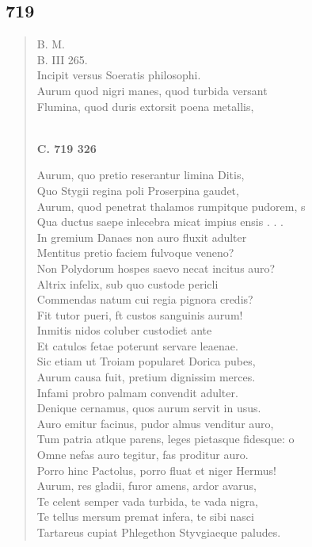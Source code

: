 \documentclass[11pt, a4paper]{report}
\begin{document}
            \subsection*{719}
      \begin{verse}
      B. M. \\ B. III 265. \\ Incipit versus Soeratis philosophi. \\ Aurum quod nigri manes, quod turbida versant \\ Flumina, quod duris extorsit poena metallis, \\ 
        ﻿\pagebreak 
    \begin{center} \textbf{C. 719 326} \end{center} \marginpar{[194]} Aurum, quo pretio reserantur limina Ditis, \\ Quo Stygii regina poli Proserpina gaudet, \\ Aurum, quod penetrat thalamos rumpitque pudorem, s \\ Qua ductus saepe inlecebra micat impius ensis . . . \\ In gremium Danaes non auro fluxit adulter \\ Mentitus pretio faciem fulvoque veneno? \\ Non Polydorum hospes saevo necat incitus auro? \\ Altrix infelix, sub quo custode pericli \\ Commendas natum cui regia pignora credis? \\ Fit tutor pueri, ft custos sanguinis aurum! \\ Inmitis nidos coluber custodiet ante \\ Et catulos fetae poterunt servare leaenae. \\ Sic etiam ut Troiam popularet Dorica pubes, \\ Aurum causa fuit, pretium dignissim merces. \\ Infami probro palmam convendit adulter. \\ Denique cernamus, quos aurum servit in usus. \\ Auro emitur facinus, pudor almus venditur auro, \\ Tum patria  \lbrack atlque parens, leges pietasque fidesque: o \\ Omne nefas auro tegitur, fas proditur auro. \\ Porro hinc Pactolus, porro fluat et niger Hermus! \\ Aurum, res gladii, furor amens, ardor avarus, \\ Te celent semper vada turbida, te vada nigra, \\ Te tellus mersum premat infera, te sibi nasci \\ Tartareus cupiat Phlegethon Styvgiaeque paludes. \\ 

\end{verse}
\end{document}
